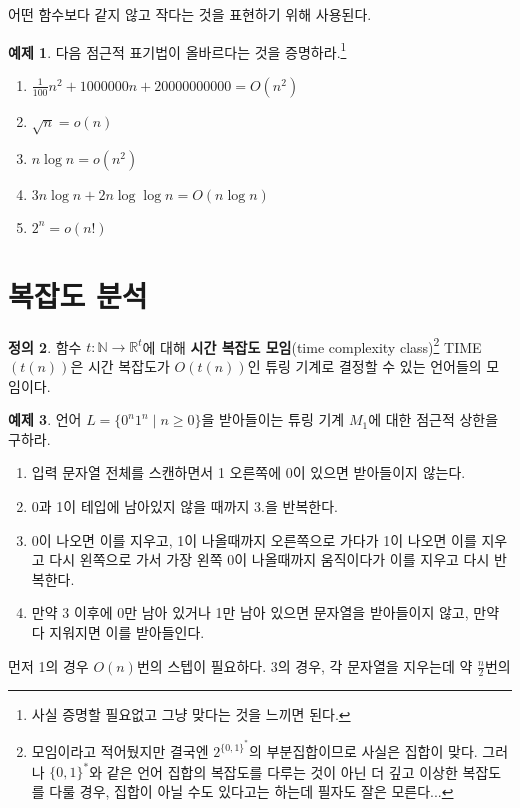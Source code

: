 \documentclass[b5paper, 11pt]{book}
\theoremstyle{definition}
\newtheorem{defn}{정의}[chapter]
\newtheorem{ex}[defn]{예제}
\begin{document}
어떤 함수보다 같지 않고 작다는 것을 표현하기 위해 사용된다. 
\begin{ex}
    다음 점근적 표기법이 올바르다는 것을 증명하라.\footnote{사실 증명할 필요없고 그냥 맞다는 것을 느끼면 된다.}
    \begin{enumerate}
        \item $\frac{1}{100}n^2 + 1000000n + 20000000000 = O(n^2)$
        \item $\sqrt{n} = o(n)$
        \item $n\log{n} = o(n^2)$
        \item $3n\log{n} + 2n\log{\log{n}} = O(n\log{n})$
        \item $2^n = o(n!)$ 
    \end{enumerate}
\end{ex}
\section{복잡도 분석}\label{time complexity}
\begin{defn}
    함수 $t: \mathbb{N} \rightarrow \mathbb{R}^{t}$에 대해 \textbf{시간 복잡도 모임}(time complexity class)\footnote{모임이라고 적어뒀지만 결국엔 $2^{\{0,1\}^*}$의 부분집합이므로 사실은 집합이 맞다. 그러나 $\{0,1\}^*$와 같은 언어 집합의 복잡도를 다루는 것이 아닌 더 깊고 이상한 복잡도를 다룰 경우, 집합이 아닐 수도 있다고는 하는데 필자도 잘은 모른다...} 
    TIME$(t(n))$은 시간 복잡도가 $O(t(n))$인 튜링 기계로 결정할 수 있는 언어들의 
    모임이다. 
\end{defn}
\begin{ex}
    언어 $L = \{0^n1^n \;\vert\; n \ge 0\}$을 받아들이는 튜링 기계 $M_1$에 대한 점근적 상한을 구하라.
    \begin{enumerate}
        \item 입력 문자열 전체를 스캔하면서 1 오른쪽에 0이 있으면 받아들이지 않는다. 
        \item 0과 1이 테입에 남아있지 않을 때까지 3.을 반복한다. 
        \item 0이 나오면 이를 지우고, 1이 나올때까지 오른쪽으로 가다가 1이 
        나오면 이를 지우고 다시 왼쪽으로 가서
        가장 왼쪽 0이 나올때까지 움직이다가 이를 지우고 다시 반복한다. 
        \item 만약 3 이후에 0만 남아 있거나 1만 남아 있으면 문자열을 받아들이지 
        않고, 만약 다 지워지면 이를 받아들인다. 
    \end{enumerate} 
\end{ex}
먼저 1의 경우 $O(n)$번의 스텝이 필요하다. 3의 경우, 각 문자열을 지우는데 약 $\frac{n}{2}$번의 
\end{document}
